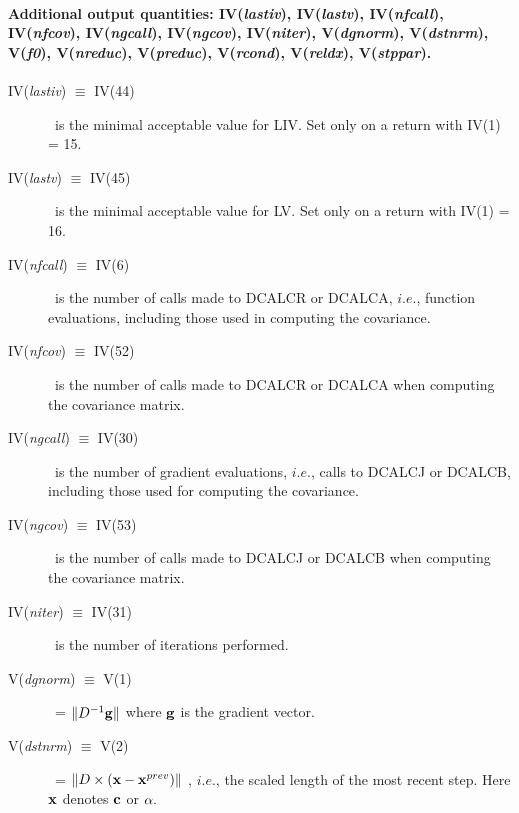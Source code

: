 \documentclass[twoside]{MATH77}
\begin{document}
\paragraph{Additional output quantities: IV({\em lastiv}),\newline
IV({\em lastv}), IV({\em nfcall}), IV({\em nfcov}),\newline
IV({\em ngcall}), IV({\em ngcov}), IV({\em niter}),\newline
V({\em dgnorm}), V({\em dstnrm}), V({\em f0}),\newline
V({\em nreduc}), V({\em preduc}), V({\em rcond}),\newline
V({\em reldx}), V({\em stppar}).}
\begin{description}
\item[IV({\em lastiv}) $\equiv $ IV(44)]  \ is the minimal acceptable value for
LIV. Set only on a return with IV(1) = 15.

\item[IV({\em lastv}) $\equiv $ IV(45)]  \ is the minimal acceptable value for LV.
Set only on a return with IV(1) = 16.

\item[IV({\em nfcall}) $\equiv $ IV(6)]  \ is the number of calls made to DCALCR
or DCALCA, $i.e.$, function evaluations, including those used in computing
the covariance.

\item[IV({\em nfcov}) $\equiv $ IV(52)]  \ is the number of calls made to DCALCR
or DCALCA when computing the covariance matrix.

\item[IV({\em ngcall}) $\equiv $ IV(30)]  \ is the number of gradient evaluations,
$i.e.$, calls to DCALCJ or DCALCB, including those used for computing the
covariance.

\item[IV({\em ngcov}) $\equiv $ IV(53)]  \ is the number of calls made to DCALCJ
or DCALCB when computing the covariance matrix.

\item[IV({\em niter}) $\equiv $ IV(31)]  \ is the number of iterations performed.

\item[V({\em dgnorm}) $\equiv $ V(1)]  \ = $\|D^{-1}{\bf g}\| $ where ${\bf g}$ is
the gradient vector.

\item[V({\em dstnrm}) $\equiv $ V(2)]  \ = $\| D\times ({\bf x}-{\bf x}^{prev})\| $%
, $i.e.$, the scaled length of the most recent step. Here ${\bf x}$ denotes $%
{\bf c}$ or ${\bf \alpha }.$


\end{description}
\end{document}
